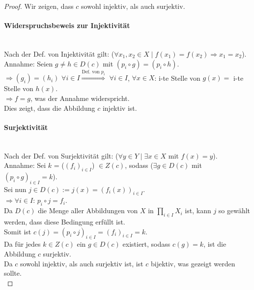 \documentclass[12pt, letterpaper]{article}
\begin{document}
\begin{proof} Wir zeigen, dass $c$ sowohl injektiv, als auch surjektiv.

\paragraph{Widerspruchsbeweis zur Injektivität}\hspace{50mm}\\

\noindent Nach der Def. von Injektivität gilt: ($\forall x_1, x_2 \in X \mid f(x_1) = f(x_2) \Rightarrow x_1 = x_2$).\\

\noindent Annahme: Seien $g \neq h \in D(c)$  mit $(p_i \circ g) = (p_i \circ h)$.\\

\noindent $\Rightarrow (g_i) = (h_i)$ $\forall i \in I \overset{\text{Def. von $p_i$}}{\Rightarrow}$ $\forall i \in I$, $\forall x \in X$: i-te Stelle von $g(x) =$ i-te Stelle von $h(x)$.\\

\noindent $\Rightarrow f = g$, was der Annahme widerspricht.\\

\noindent Dies zeigt, dass die Abbildung $c$ injektiv ist.

\paragraph{Surjektivität}\hspace{50mm}\\

\noindent Nach der Def. von Surjektivität gilt: ($\forall y \in Y \mid \exists x \in X$ mit $f(x) = y$).\\

\noindent Annahme: Sei $k$ = ($(f_i)_{i \in I}$) $\in Z(c)$, sodass ($\exists g \in D(c)$ mit $(p_i \circ g)_{i \in I} = k$).\\

\noindent Sei nun $j \in D(c) := j(x) = (f_i(x))_{i \in I}$.\\

\noindent $\Rightarrow \forall i \in I$: $p_i \circ j = f_i$.\\

\noindent Da $D(c)$ die Menge aller Abbildungen von $X$ in $\prod_{i \in I} X_i$ ist, kann $j$ so gewählt werden, dass diese Bedingung erfüllt ist.\\

\noindent Somit ist $c(j) = (p_i \circ j)_{i \in I} = (f_i)_{i \in I} = k$.\\

\noindent Da für jedes $k \in Z(c)$ ein $g \in D(c)$ existiert, sodass $c(g) = k$, ist die Abbildung $c$ surjektiv.\\

\noindent Da $c$ sowohl injektiv, als auch surjektiv ist, ist $c$ bijektiv, was gezeigt werden sollte.\\

\end{proof}
\end{document}
